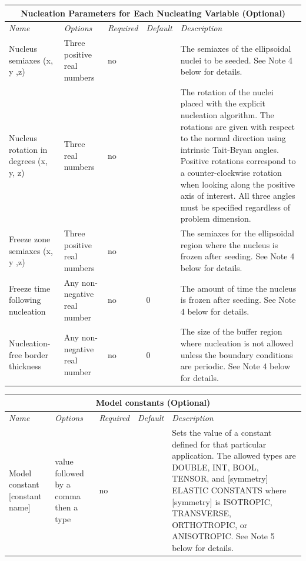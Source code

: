 \documentclass[10pt]{article} %
\begin{document}
\begin{center}
    \begin{tabular}{ | p{} | p{} | p{} | p{} | p{} |}
    \hline
      \multicolumn{5}{|c|}{\textbf{Nucleation Parameters for Each Nucleating Variable (Optional)}} \\
    \hline
    \hline
    \emph{Name} & \emph{Options} & \emph{Required} & \emph{Default} & \emph{Description} \\ \hline
    Nucleus semiaxes (x, y ,z) & Three positive real numbers & no &  & The semiaxes of the ellipsoidal nuclei to be seeded. See Note 4 below for details. \\ \hline
    Nucleus rotation in degrees (x, y, z) & Three real numbers & no & & The rotation of the nuclei placed with the explicit nucleation algorithm. The rotations are given with respect to the normal direction using intrinsic Tait-Bryan angles. Positive rotations correspond to a  counter-clockwise rotation when looking along the positive axis of interest. All three angles must be specified regardless of problem dimension. \\ \hline
    Freeze zone semiaxes (x, y ,z) & Three positive real numbers & no &  & The semiaxes for the ellipsoidal region where the nucleus is frozen after seeding. See Note 4 below for details.  \\ \hline
    Freeze time following nucleation & Any non-negative real number & no & 0 & The amount of time the nucleus is frozen after seeding. See Note 4 below for details. \\ \hline
    Nucleation-free border thickness & Any non-negative real number & no & 0 & The size of the buffer region where nucleation is not allowed unless the boundary conditions are periodic. See Note 4 below for details. \\ \hline
    \end{tabular}
\end{center}

\begin{center}
    \begin{tabular}{ | p{} | p{} | p{} | p{} | p{} |}
    \hline
      \multicolumn{5}{|c|}{\textbf{Model constants (Optional)}} \\
    \hline
    \hline
    \emph{Name} & \emph{Options} & \emph{Required} & \emph{Default} & \emph{Description} \\ \hline
    Model constant [constant name] & value followed by a comma then a type & no &  & Sets the value of a constant defined for that particular application. The allowed types are DOUBLE, INT, BOOL, TENSOR, and [symmetry] ELASTIC CONSTANTS where [symmetry] is ISOTROPIC, TRANSVERSE, ORTHOTROPIC, or ANISOTROPIC. See Note 5 below for details. \\ \hline
    \end{tabular}
\end{center}
\end{document}
